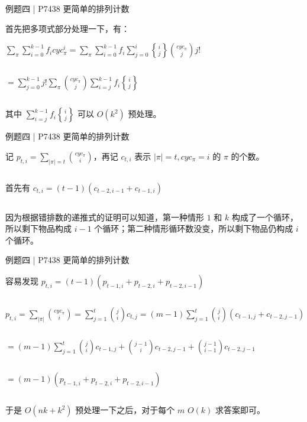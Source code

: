 \documentclass{beamer}
\begin{document}
\begin{frame}{例题四 | P7438 更简单的排列计数}

    首先把多项式部分处理一下，有：

    $\sum\limits_{\pi}\sum\limits_{i=0}^{k-1}{f_icyc_{\pi}^i}=\sum\limits_{\pi}\sum\limits_{i=0}^{k-1}f_i\sum\limits_{j=0}^{i}{{i\brace j}\binom {cyc_{\pi}}j j!}$

    $ $
    
    $=\sum\limits_{j=0}^{k-1}j!\sum\limits_{\pi}{\binom {cyc_{\pi}}j}\sum\limits_{i=j}^{k-1}f_i{i\brace j}$

    $ $
    \pause

    其中 $\sum\limits_{i=j}^{k-1}f_i{i\brace j}$ 可以 $O(k^2)$ 预处理。
    
\end{frame}

\begin{frame}{例题四 | P7438 更简单的排列计数}
    
    记 $p_{t,i}=\sum\limits_{|\pi|=t}{\binom {cyc_{\pi}}i}$，再记 $c_{t,i}$ 表示 $|\pi|=t,cyc_{\pi}=i$ 的 $\pi$ 的个数。

    $ $
    \pause

    首先有 $c_{t,i} = (t-1)(c_{t-2,i-1} + c_{t-1,i})$

    $ $
    \pause

    因为根据错排数的递推式的证明可以知道，第一种情形 $1$ 和 $k$ 构成了一个循环，所以剩下物品构成 $i-1$ 个循环；第二种情形循环数没变，所以剩下物品仍构成 $i$ 个循环。
    
\end{frame}

\begin{frame}{例题四 | P7438 更简单的排列计数}

    容易发现 $p_{t,i}=(t-1)(p_{t-1,i}+p_{t-2,i}+p_{t-2,i-1})$

    $ $
    \pause

    $p_{t,i}=\sum\limits_{|\pi|}{\binom {cyc_{\pi}}i}=\sum\limits_{j=1}^{t}{\binom ji c_{t,j}}=(m-1)\sum\limits_{j=1}^t{\binom ji (c_{t-1,j}+c_{t-2,j-1})}$

    $ $
    \pause
    
    $=(m-1)\sum\limits_{j=1}^t{\binom jic_{t-1,j} +\binom{j-1}{i}c_{t-2,j-1}+\binom{j-1}{i-1}c_{t-2,j-1}}$

    $ $
    \pause

    $=(m-1)(p_{t-1,i}+p_{t-2,i}+p_{t-2,i-1})$

    $ $
    \pause

    于是 $O(nk+k^2)$ 预处理一下之后，对于每个 $m$ $O(k)$ 求答案即可。
    
\end{frame}
\end{document}
